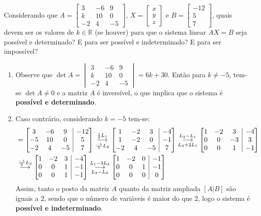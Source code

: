 \documentclass[12pt,a4paper]{article}
\makeatletter
\newcommand*\R{\mathbb{R}}
\newenvironment{amatrix}[1]{%
  \left[\begin{array}{@{}*{#1}{c}|c@{}}
}{%
  \end{array}\right]
}
\newcommand{\grstep}[2][\relax]{%
   \ensuremath{\mathrel{
       {\mathop{\longrightarrow}\limits^{#2\mathstrut}_{
                                     \begin{subarray}{l} #1 \end{subarray}}}}}}
\makeatother
\begin{document}
\begin{ExerciseList}
\Exercise[title={2,0}] Considerando que $A=
\begin{bmatrix}
 3 & -6 &  9\\
 k & 10 &  0\\
-2 &  4 & -5
\end{bmatrix}
$, $X=
\begin{bmatrix}
x\\
y\\
z
\end{bmatrix}$ e $B=
\begin{bmatrix}
-12\\
  5\\
  7
\end{bmatrix}$, quais devem ser os valores de $k \in \R$ (se houver) para que o sistema linear $AX = B$ seja possível e determinado? E para ser possível e indeterminado? E para ser impossível?
\Answer
\begin{enumerate}
\item Observe que $\det{A} = \begin{vmatrix}
 3 & -6 &  9\\
 k & 10 &  0\\
-2 &  4 & -5
\end{vmatrix} = 6k+30$. Então para $k \neq -5$, tem-se $\det{A} \neq 0$ e a matriz $A$ é inversível, o que implica que o sistema é \textbf{possível e determinado}.
\item Caso contrário, considerando $k = -5$ tem-se:
\begin{align*}
[A|B]
& =
\begin{amatrix}{3}
3 & -6 & 9 & -12 \\
-5 & 10 & 0 & 5\\
-2 & 4 & -5 & 7
\end{amatrix}
\grstep[ \frac{-1}{5}L_2 ]{ \frac{1}{3}L_1 }
\begin{amatrix}{3}
1 & -2 & 3 & -4 \\
1 & -2 & 0 & -1\\
-2 & 4 & -5 & 7
\end{amatrix}
\grstep[ L_3 + 2 L_1 ]{ L_2 - L_1 }
\begin{amatrix}{3}
1 & -2 & 3 & -4 \\
0 & 0 & -3 & 3 \\
0 & 0 & 1 & -1
\end{amatrix}\\
&
\grstep{ \frac{-1}{3} L_2 }
\begin{amatrix}{3}
1 & -2 & 3 & -4 \\
0 & 0 & 1 & -1 \\
0 & 0 & 1 & -1
\end{amatrix}
\grstep[ L_3 - L_2 ]{ L_1 - 3 L_2 }
\begin{amatrix}{3}
1 & -2 & 0 & -1 \\
0 & 0 & 1 & -1 \\
0 & 0 & 0 & 0
\end{amatrix}
\end{align*}
Assim, tanto o posto da matriz $A$ quanto da matriz ampliada $[A|B]$ são iguais a $2$, sendo que o número de variáveis é maior do que $2$, logo o sistema é \textbf{possível e indeterminado}.


\end{enumerate}
\end{ExerciseList}
\end{document}
